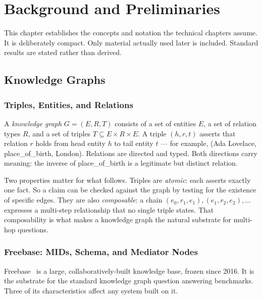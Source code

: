 \chapter{Background and Preliminaries}\label{ch:prelim}

This chapter establishes the concepts and notation the technical chapters
assume. It is deliberately compact. Only material actually used later is
included. Standard results are stated rather than derived.

\section{Knowledge Graphs}\label{sec:kgs}

\subsection{Triples, Entities, and Relations}

A \emph{knowledge graph} $G = (E, R, T)$ consists of a set of entities $E$, a
set of relation types $R$, and a set of
triples $T \subseteq E \times R \times E$. A triple $(h, r, t)$
asserts that relation $r$ holds from head entity $h$ to tail entity $t$ --- for
example, \textsf{(Ada Lovelace, place\_of\_birth, London)}. Relations are
directed and typed. Both directions carry meaning: the inverse of
\textsf{place\_of\_birth} is a legitimate but distinct relation.

Two properties matter for what follows. Triples are \emph{atomic}: each asserts
exactly one fact. So a claim can be checked against the graph by testing for the
existence of specific edges. They are also \emph{composable}: a chain $(e_0,
r_1, e_1), (e_1, r_2, e_2), \dots$ expresses a multi-step relationship that no
single triple states. That composability is what makes a knowledge graph the
natural substrate for multi-hop questions.

\subsection{Freebase: MIDs, Schema, and Mediator Nodes}

Freebase~\cite{bollacker2008freebase} is a large, collaboratively-built
knowledge base, frozen since 2016. It is the substrate for the
standard knowledge graph question answering benchmarks. Three of its
characteristics affect any system built on it.

